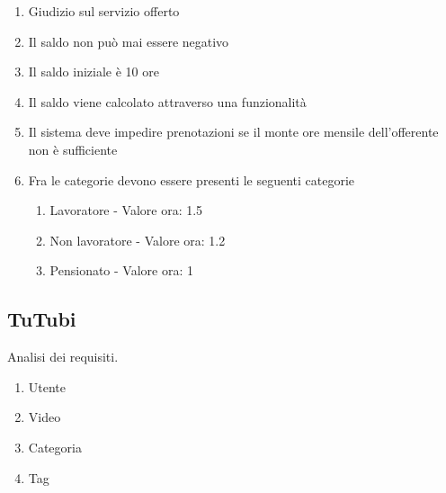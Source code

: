 \begin{enumerate}
\begin{enumerate}
        \item Offerente (req \ref{itm:bdt_abilita})
        \item Feedback del richiedente sull'offerente
        \item Data e ora di inizio
        \item Durata in ore (intero o reale? sicuramente > 0)
        \item Abilit\`a richiesta (req \ref{itm:bdt_abilita})
    \end{enumerate}
    \item Giudizio sul servizio offerto
    \item Il saldo non pu\`o mai essere negativo
    \item Il saldo iniziale \`e 10 ore
    \item Il saldo viene calcolato attraverso una funzionalit\`a
    \item Il sistema deve impedire prenotazioni se il monte ore mensile dell'offerente non \`e sufficiente
    \item Fra le categorie devono essere presenti le seguenti categorie
    \begin{enumerate}
        \item Lavoratore - Valore ora: 1.5
        \item Non lavoratore - Valore ora: 1.2
        \item Pensionato - Valore ora: 1
    \end{enumerate}
\end{enumerate}

\subsection{TuTubi}

Analisi dei requisiti.

\begin{enumerate}
    \item Utente
    \item Video
    \item Categoria
    \item Tag
\end{enumerate}




































